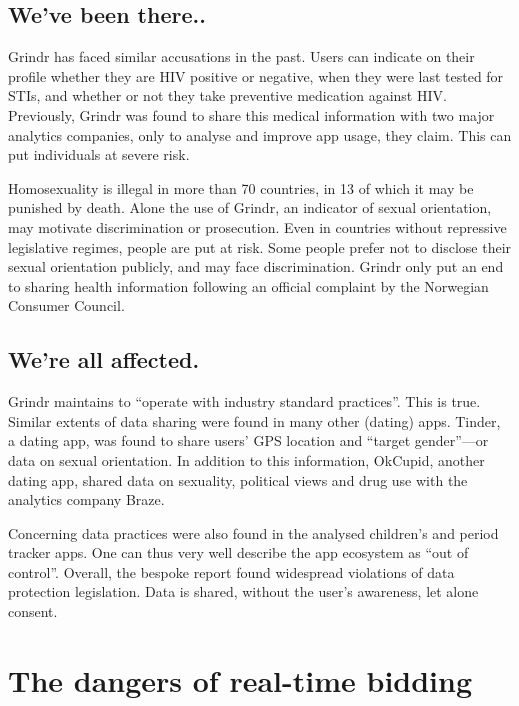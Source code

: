 \documentclass[
]{book}
\begin{document}
\hypertarget{weve-been-there..}{%
\subsection{We've been there..}\label{weve-been-there..}}

Grindr has faced similar accusations in the past. Users can indicate on their profile whether they are HIV positive or negative, when they were last tested for STIs, and whether or not they take preventive medication against HIV. Previously, Grindr was found to share this medical information with two major analytics companies, only to analyse and improve app usage, they claim. This can put individuals at severe risk.

Homosexuality is illegal in more than 70 countries, in 13 of which it may be punished by death. Alone the use of Grindr, an indicator of sexual orientation, may motivate discrimination or prosecution. Even in countries without repressive legislative regimes, people are put at risk. Some people prefer not to disclose their sexual orientation publicly, and may face discrimination. Grindr only put an end to sharing health information following an official complaint by the Norwegian Consumer Council.

\hypertarget{were-all-affected.}{%
\subsection{We're all affected.}\label{were-all-affected.}}

Grindr maintains to ``operate with industry standard practices''. This is true. Similar extents of data sharing were found in many other (dating) apps. Tinder, a dating app, was found to share users' GPS location and ``target gender''---or data on sexual orientation. In addition to this information, OkCupid, another dating app, shared data on sexuality, political views and drug use with the analytics company Braze.

Concerning data practices were also found in the analysed children's and period tracker apps. One can thus very well describe the app ecosystem as ``out of control''. Overall, the bespoke report found widespread violations of data protection legislation. Data is shared, without the user's awareness, let alone consent.

\hypertarget{the-dangers-of-real-time-bidding}{%
\section{The dangers of real-time bidding}\label{the-dangers-of-real-time-bidding}}
\end{document}
